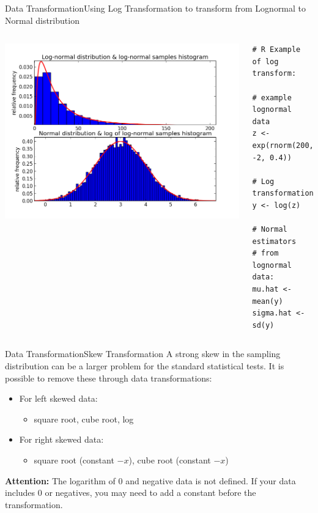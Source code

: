 \begin{frame}[fragile]{Data Transformation}{Using Log Transformation to transform from Lognormal to Normal distribution}
  \begin{columns}
    \begin{center}
      \includegraphics[width=1\textwidth]{../img/lognormal_transformation}
    \end{center}
{\smaller
\begin{verbatim}
# R Example of log transform:

# example lognormal data
z <- exp(rnorm(200, -2, 0.4))

# Log transformation
y <- log(z)

# Normal estimators
# from lognormal data:
mu.hat <- mean(y)
sigma.hat <- sd(y)
\end{verbatim}}
  \end{columns}
\end{frame}


\begin{frame}{Data Transformation}{Skew Transformation}
  A strong skew in the sampling distribution can be a larger problem for the standard statistical tests. It is possible to remove these through data transformations:\bigskip

  \begin{itemize}
    \item For left skewed data:
    \begin{itemize}
      \item square root, cube root, log
    \end{itemize}
    \item For right skewed data:
    \begin{itemize}
      \item square root (constant $-x$), cube root (constant $-x$)
    \end{itemize}
  \end{itemize}\bigskip

  {\bf Attention:} The logarithm of 0 and negative data is not defined. If your data includes 0 or negatives, you may need to add a constant before the transformation.
\end{frame}



